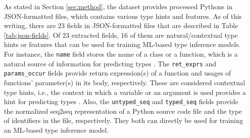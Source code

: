 \documentclass[10pt, conference]{IEEEtran}
\begin{document}
As stated in Section \ref{sec:method}, the dataset provides processed Pythons in JSON-formatted files, which contains various type hints and features. As of this writing, there are 23 fields in JSON-formatted files that are described in Table \ref{tab:json-fields}. Of 23 extracted fields, 16 of them are natural/contextual type hints or features that can be used for training ML-based type inference models. For instance, the \texttt{name} field stores the name of a class or a function, which is a natural source of information for predicting types \cite{malik2019nl2type}. The \texttt{ret\_exprs} and \texttt{params\_occur} fields provide return expression(s) of a function and usages of functions' parameter(s) in its body, respectively. These are considered contextual type hints, i.e., the context in which a variable or an argument is used provides a hint for predicting types \cite{pradel2019typewriter}. Also, the \texttt{untyped\_seq} and \texttt{typed\_seq} fields provide the normalized seq2seq representation of a Python source code file and the type of identifiers in the file, respectively. They both can directly be used for training an ML-based type inference model.
\end{document}
